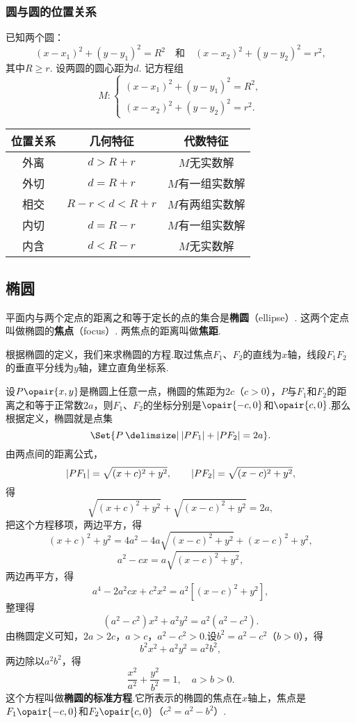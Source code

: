 \subsubsection{圆与圆的位置关系}
已知两个圆：\[
(x-x_1)^2+(y-y_1)^2=R^2
\quad\text{和}\quad
(x-x_2)^2+(y-y_2)^2=r^2,
\]其中\(R \geqslant r\).
设两圆的圆心距为\(d\).
记方程组\[
M: \begin{cases}
(x-x_1)^2+(y-y_1)^2=R^2, \\
(x-x_2)^2+(y-y_2)^2=r^2.
\end{cases}
\]
\begin{center}
\begin{tabular}{*3{c}}
\hline
位置关系 & 几何特征 & 代数特征 \\ \hline
外离 & \(d>R+r\) & \(M\)无实数解 \\
外切 & \(d=R+r\) & \(M\)有一组实数解 \\
相交 & \(R-r<d<R+r\) & \(M\)有两组实数解 \\
内切 & \(d=R-r\) & \(M\)有一组实数解 \\
内含 & \(d<R-r\) & \(M\)无实数解 \\
\hline
\end{tabular}
\end{center}

\subsection{椭圆}
\begin{definition}
平面内与两个定点的距离之和等于定长的点的集合是\textbf{椭圆}（ellipse）.
这两个定点叫做椭圆的\textbf{焦点}（focus）.
两焦点的距离叫做\textbf{焦距}.
\end{definition}

根据椭圆的定义，我们来求椭圆的方程.取过焦点\(F_1\)、\(F_2\)的直线为\(x\)轴，线段\(F_1 F_2\)的垂直平分线为\(y\)轴，建立直角坐标系.

设\(P\opair{x,y}\)是椭圆上任意一点，椭圆的焦距为\(2c\)（\(c > 0\)），\(P\)与\(F_1\)和\(F_2\)的距离之和等于正常数\(2a\)，则\(F_1\)、\(F_2\)的坐标分别是\(\opair{-c,0}\)和\(\opair{c,0}\).那么根据定义，椭圆就是点集\[
\Set{ P \given \abs{P F_1} + \abs{P F_2} = 2a }.
\]由两点间的距离公式，\[
\abs{P F_1} = \sqrt{(x+c)^2+y^2},
\qquad
\abs{P F_2} = \sqrt{(x-c)^2+y^2},
\]得\[
\sqrt{(x+c)^2+y^2} + \sqrt{(x-c)^2+y^2} = 2a,
\]把这个方程移项，两边平方，得\[
(x+c)^2+y^2 = 4a^2 - 4a\sqrt{(x-c)^2+y^2} + (x-c)^2+y^2,
\]\[
a^2 - cx = a\sqrt{(x-c)^2+y^2},
\]两边再平方，得\[
a^4 - 2 a^2 cx + c^2 x^2 = a^2 [(x-c)^2+y^2],
\]整理得\[
(a^2 - c^2) x^2 + a^2 y^2 = a^2 (a^2 - c^2).
\]由椭圆定义可知，\(2a > 2c\)，\(a > c\)，\(a^2 - c^2 > 0\).设\(b^2 = a^2 - c^2\)（\(b > 0\)），得\[
b^2 x^2 + a^2 y^2 = a^2 b^2,
\]两边除以\(a^2 b^2\)，得\begin{equation}
\frac{x^2}{a^2} + \frac{y^2}{b^2} = 1,
\quad a > b > 0.
\end{equation}
这个方程叫做\textbf{椭圆的标准方程}.它所表示的椭圆的焦点在\(x\)轴上，焦点是\(F_1\opair{-c,0}\)和\(F_2\opair{c,0}\)（\(c^2 = a^2 - b^2\)）.

